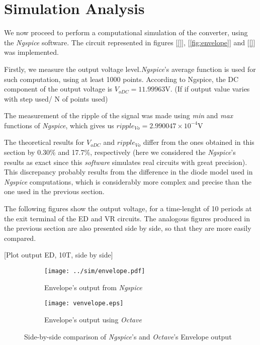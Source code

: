 \section{Simulation Analysis}
\label{sec:simulation}

\par We now proceed to perform a computational simulation of the converter, using the \textit{Ngspice} software. The circuit represented in figures [\ref{}], [\ref{fig:envelope}] and [\ref{}] was implemented.

Firstly, we measure the output voltage level.\textit{Ngspice}'s average function is used for such computation, using at least 1000 points. According to Ngspice, the DC component of the output voltage
is $V_{oDC}=11.99963$V. (If if output value varies with step used/ N of points used)\par
The measurement of the ripple of the signal was made using \textit{min} and \textit{max} functions of \textit{Ngspice}, which gives us $ripple_{Vo}=2.990047 \times 10^{-4}$V

The theoretical results for $V_{oDC}$ and $ripple_{Vo}$ differ from the ones obtained in this section  by 0.30\% and 17.7\%, respectively (here we considered the \textit{Ngspice}'s results as exact since this \textit{software} simulates real circuits with great precision).
This discrepancy probably results from the difference in the diode model used in \textit{Ngspice} computations, which is considerably more complex and precise than the one used in the previous section.

The following figures show the output voltage, for a time-lenght of 10 periods at the exit terminal of the ED and VR circuits.  The analogous figures produced in the previous section are also presented side by side, so that they are more easily compared.

[Plot output ED, 10T, side by side]
\begin{figure}[H]
\centering
\begin{subfigure}{.5\textwidth}
  \centering
  \texttt{[image: ../sim/envelope.pdf]}
  \caption{Envelope's output from \textit{Ngspice}}
  \label{fig:EnvelopeNGSPICE}
\end{subfigure}%
\begin{subfigure}{.5\textwidth}
  \centering
  \texttt{[image: venvelope.eps]}
  \caption{Envelope's output using \textit{Octave}}
  \label{fig:EnvelopeOCTAVE}
\end{subfigure}
\caption{Side-by-side comparison of \textit{Ngspice}'s and \textit{Octave}'s Envelope output}
\label{fig:EnvelopeComparacao}
\end{figure}

